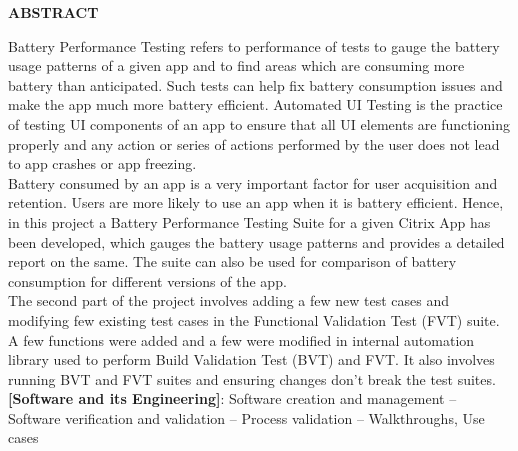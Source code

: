 \setlength\parindent{0pt}
\begin{center}
\large{\textbf{ABSTRACT}}\\
\vspace{1cm}
\end{center}
Battery Performance Testing refers to performance of tests to gauge the battery usage patterns of a given app and to find areas which are consuming more battery than anticipated. Such tests can help fix battery consumption issues and make the app much more battery efficient. Automated UI Testing is the practice of testing UI components of an app to ensure that all UI elements are functioning properly and any action or series of actions performed by the user does not lead to app crashes or app freezing.\\

Battery consumed by an app is a very important factor for user acquisition and retention. Users are more likely to use an app when it is battery efficient. Hence, in this project a Battery Performance Testing Suite for a given Citrix App has been developed, which gauges the battery usage patterns and provides a detailed report on the same. The suite can also be used for comparison of battery consumption for different versions of the app.\\

The second part of the project involves adding a few new test cases and modifying few existing test cases in the Functional Validation Test (FVT) suite. A few functions were added and a few were modified in internal automation library used to perform Build Validation Test (BVT) and FVT. It also involves running BVT and FVT suites and ensuring changes don't break the test suites.\\

\textbf{[Software and its Engineering]}:   Software creation and management -- Software verification and validation --  Process validation -- Walkthroughs, Use cases
